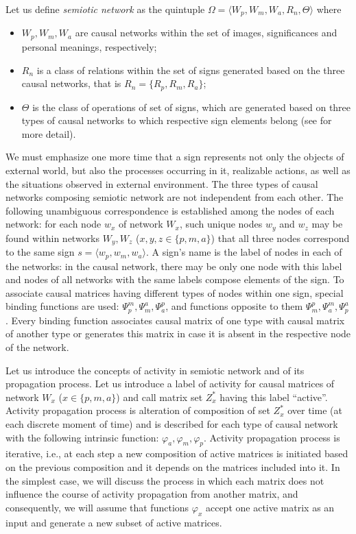 \documentclass[review]{elsarticle}
\begin{document}
Let us define \textit {semiotic network} as the quintuple $\Omega=\langle W_p, W_m, W_a, R_n, \Theta \rangle$ where
\begin{itemize}
	\item $W_p, W_m, W_a$ are causal networks within the set of images, significances and personal meanings, respectively;
	\item $R_n$ is a class of relations within the set of signs generated based on the three causal networks, that is $R_n=\{R_p, R_m, R_a\}$;
	\item $\Theta$ is the class of operations of set of signs, which are generated based on three types of causal networks to which respective sign elements belong (see \cite{Osipov2014c} for more detail).
\end{itemize} 

We must emphasize one more time that a sign represents not only the objects of external world, but also the processes occurring in it, realizable actions, as well as the situations observed in external environment.
The three types of causal networks composing semiotic network are not independent from each other. The following unambiguous correspondence is established among the nodes of each network: for each node $w_x$ of network $W_x$, such unique nodes $w_y$ and $w_z$ may be found within networks $W_y, W_z$ ($x,y,z\in\{p,m,a\}$) that all three nodes correspond to the same sign $s=\langle w_p, w_m, w_a\rangle$. A sign's name is the label of nodes in each of the networks: in the causal network, there may be only one node with this label and nodes of all networks with the same labels compose elements of the sign. To associate causal matrices having different types of nodes within one sign, special binding functions are used: $\Psi_p^m, \Psi_m^a,\Psi_a^p$, and functions opposite to them $\Psi_m^p,\Psi_a^m,\Psi_p^a$ \cite{Osipov2014c}. Every binding function associates causal matrix of one type with causal matrix of another type or generates this matrix in case it is absent in the respective node of the network.

Let us introduce the concepts of activity in semiotic network and of its propagation process. Let us introduce a label of activity for causal matrices of network $W_x$ ($x\in\{p,m,a\}$) and call matrix set $Z_x^*$ having this label ``active''. Activity propagation process is alteration of composition of set $Z_x^*$ over time (at each discrete moment of time) and is described for each type of causal network with the following intrinsic function: $\varphi_a, \varphi_m,\varphi_p$. Activity propagation process is iterative, i.e., at each step a new composition of active matrices is initiated based on the previous composition and it depends on the matrices included into it. In the simplest case, we will discuss the process in which each matrix does not influence the course of activity propagation from another matrix, and consequently, we will assume that functions $\varphi_x$ accept one active matrix as an input and generate a new subset of active matrices. 
\end{document}
